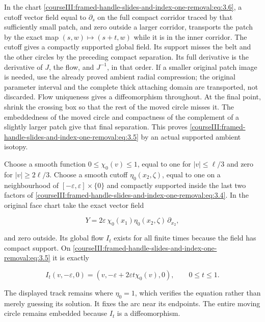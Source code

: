 In the chart \eqref{courseIII:framed-handle-slides-and-index-one-removal:eq:3.6}, a cutoff vector field equal to \(\partial_s\) on the full compact corridor traced by that sufficiently small patch, and zero outside a larger corridor, transports the patch by the exact map \((s,w)\mapsto(s+t,w)\) while it is in the inner corridor. The cutoff gives a compactly supported global field. Its support misses the belt and the other circles by the preceding compact separation. Its full derivative is the derivative of \(J\), the flow, and \(J^{-1}\), in that order. If a smaller original patch image is needed, use the already proved ambient radial compression; the original parameter interval and the complete thick attaching domain are transported, not discarded. Flow uniqueness gives a diffeomorphism throughout. At the final point, shrink the crossing box so that the rest of the moved circle misses it. The embeddedness of the moved circle and compactness of the complement of a slightly larger patch give that final separation. This proves \eqref{courseIII:framed-handle-slides-and-index-one-removal:eq:3.5} by an actual supported ambient isotopy.

Choose a smooth function \(0\leq\chi_0(v)\leq1\), equal to one for \(|v|\leq\ell/3\) and zero for \(|v|\geq2\ell/3\). Choose a smooth cutoff \(\eta_0(x_2,\zeta)\), equal to one on a neighbourhood of \([-\varepsilon,\varepsilon]\times\{0\}\) and compactly supported inside the last two factors of \eqref{courseIII:framed-handle-slides-and-index-one-removal:eq:3.4}. In the original face chart take the exact vector field

\begin{equation}
Y=2\varepsilon\,\chi_0(x_1)\eta_0(x_2,\zeta)\,\partial_{x_2},
 \label{courseIII:framed-handle-slides-and-index-one-removal:eq:3.7}
\end{equation}

and zero outside. Its global flow \(I_t\) exists for all finite times because the field has compact support. On \eqref{courseIII:framed-handle-slides-and-index-one-removal:eq:3.5} it is exactly

\begin{equation}
I_t(v,-\varepsilon,0)
   =(v,-\varepsilon+2\varepsilon t\chi_0(v),0),
 \qquad 0\leq t\leq1.
 \label{courseIII:framed-handle-slides-and-index-one-removal:eq:3.8}
\end{equation}

The displayed track remains where \(\eta_0=1\), which verifies the equation rather than merely guessing its solution. It fixes the arc near its endpoints. The entire moving circle remains embedded because \(I_t\) is a diffeomorphism.

